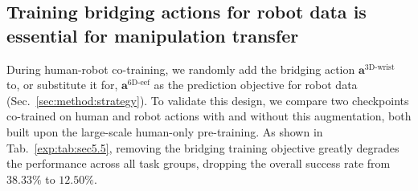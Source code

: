 \subsection{Training bridging actions for robot data is essential for manipulation transfer}
\label{sec:exp:bridging_tasks}

%
During human-robot co-training, we randomly add the bridging action $\mathbf{a}^{\text{3D-wrist}}$ to, or substitute it for, $\mathbf{a}^{\text{6D-eef}}$ as the prediction objective for robot data (Sec.~\ref{sec:method:strategy}).
% 
To validate this design, we compare two checkpoints co-trained on human and robot actions with and without this augmentation, both built upon the large-scale human-only pre-training.
% 
As shown in Tab.~\ref{exp:tab:sec5.5}, removing the bridging training objective greatly degrades the performance across all task groups, dropping the overall success rate from $38.33\%$ to $12.50\%$.



\begin{table}[htbp]
\centering
\caption{
    \textbf{Ablation of the bridging objective on robot data.}
    During co-training, it is essential to also supervise the bridging action on robot data for manipulation skill transfer.
}
\label{exp:tab:sec5.5}
\end{table}






